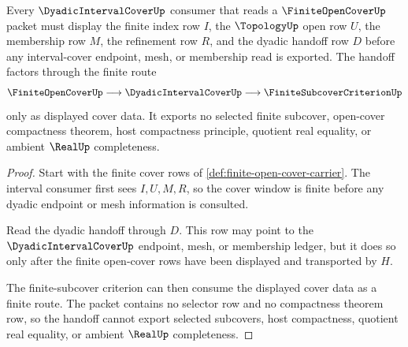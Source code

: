 \begin{theorem}
\label{thm:finite-open-cover-dyadic-interval-handoff}
Every $\DyadicIntervalCoverUp$ consumer that reads a $\FiniteOpenCoverUp$ packet must display the finite index row $I$, the $\TopologyUp$ open row $U$, the membership row $M$, the refinement row $R$, and the dyadic handoff row $D$ before any interval-cover endpoint, mesh, or membership read is exported. The handoff factors through the finite route
$$
\FiniteOpenCoverUp
\longrightarrow
\DyadicIntervalCoverUp
\longrightarrow
\FiniteSubcoverCriterionUp
$$
only as displayed cover data. It exports no selected finite subcover, open-cover compactness theorem, host compactness principle, quotient real equality, or ambient $\RealUp$ completeness.
\end{theorem}
\begin{proof}
Start with the finite cover rows of \autoref{def:finite-open-cover-carrier}. The interval consumer first sees $I,U,M,R$, so the cover window is finite before any dyadic endpoint or mesh information is consulted.

Read the dyadic handoff through $D$. This row may point to the $\DyadicIntervalCoverUp$ endpoint, mesh, or membership ledger, but it does so only after the finite open-cover rows have been displayed and transported by $H$.

The finite-subcover criterion can then consume the displayed cover data as a finite route. The packet contains no selector row and no compactness theorem row, so the handoff cannot export selected subcovers, host compactness, quotient real equality, or ambient $\RealUp$ completeness.
\end{proof}


\begin{closurestatus}{\FiniteOpenCoverUp}
  \theoryclosure{\seedClosure}
  \formalstatus{\unformalizedV}
\end{closurestatus}
